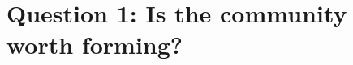 \documentclass[11pt,a4paper]{article}
\begin{document}
\section{Question 1: Is the community worth forming?}
\setcounter{subsection}{2}

\end{document}
